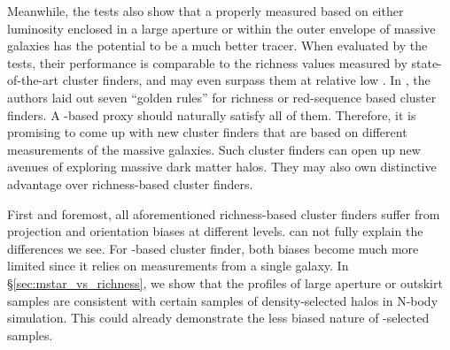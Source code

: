 \documentclass[fleqn,usenatbib,useAMS,english]{mnras}
\begin{document}
    Meanwhile, the \topn{} tests also show that a properly measured \mstar{} based on either
    luminosity enclosed in a large aperture or within the outer envelope of massive galaxies has
    the potential to be a much better \mvir{} tracer.
    When evaluated by the \topn{} tests, their performance is comparable to the richness values
    measured by state-of-the-art cluster finders, and may even surpass them at relative low
    \mvir{}.
    In \citet{Rykoff2014}, the authors laid out seven ``golden rules'' for richness or 
    red-sequence based cluster finders.
    A \mstar{}-based \mvir{} proxy should naturally satisfy all of them.
    Therefore, it is promising to come up with new cluster finders that are based on different 
    \mstar{} measurements of the massive galaxies.
    Such cluster finders can open up new avenues of exploring massive dark matter halos.
    They may also own distinctive advantage over richness-based cluster finders.
    
    First and foremost, all aforementioned richness-based cluster finders suffer from 
    projection and orientation biases at different levels. 
    can not fully explain the differences we see.
    For \mstar{}-based cluster finder, both biases become much more limited since it 
    relies on measurements from a single galaxy.
    In \S \ref{sec:mstar_vs_richness}, we show that the \dsigma{} profiles of large aperture or
    outskirt \mstar{} \topn{} samples are consistent with certain samples of density-selected
    halos in N-body simulation.
    This could already demonstrate the less biased nature of \mstar{}-selected samples.
\end{document}
